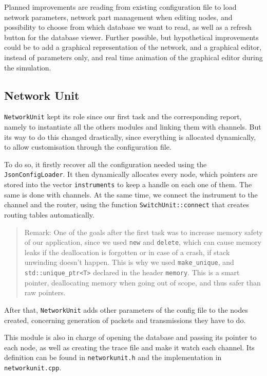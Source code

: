 \documentclass[12pt,a4paper]{article}
\begin{document}
Planned improvements are reading from existing configuration file to load network parameters, network part management when editing nodes, and possibility to choose from which database we want to read, as well as a refresh button for the database viewer.
Further possible, but hypothetical improvements could be to add a graphical representation of the network, and a graphical editor, instead of parameters only, and real time animation of the graphical editor during the simulation.

\subsection{Network Unit}
\texttt{NetworkUnit} kept its role since our first task and the corresponding report, namely to instantiate all the others modules and linking them with channels. But its way to do this changed drastically, since everything is allocated dynamically, to allow customisation through the configuration file.

To do so, it firstly recover all the configuration needed using the \texttt{JsonConfigLoader}. It then dynamically allocates every node, which pointers are stored into the vector \texttt{instruments} to keep a handle on each one of them. The same is done with channels. At the same time, we connect the instrument to the channel and the router, using the function \texttt{SwitchUnit::connect} that creates routing tables automatically. 
\begin{quote}
Remark: One of the goals after the first task was to increase memory safety of our application, since we used \texttt{new} and \texttt{delete}, which can cause memory leaks if the deallocation is forgotten or in case of a crash, if stack unwinding doesn't happen. This is why we used \texttt{make\_unique}, and \texttt{std::unique\_ptr<T>} declared in the header \texttt{memory}. This is a smart pointer, deallocating memory when going out of scope, and thus safer than raw pointers.
\end{quote}

After that, \texttt{NetworkUnit} adds other parameters of the config file to the nodes created, concerning generation of packets and transmissions they have to do.

This module is also in charge of opening the database and passing its pointer to each node, as well as creating the trace file and make it watch each channel. Its definition can be found in \texttt{networkunit.h} and the implementation in \texttt{networkunit.cpp}.
\end{document}

